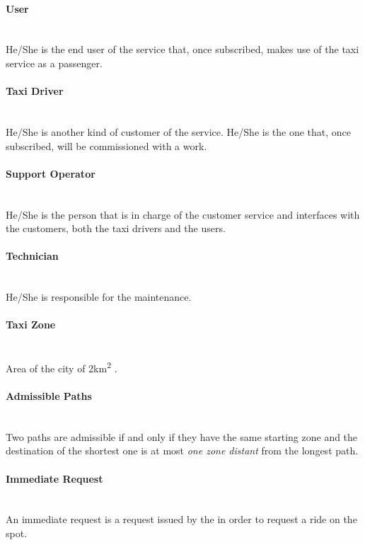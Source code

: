 \paragraph{User} \hfill \\
\label{def:user} He/She is the end user of the service that, once subscribed, makes use of the taxi service as a passenger.

\paragraph{Taxi Driver} \hfill \\
\label{def:taxidriver} He/She is another kind of customer of the service. He/She is the one that, once subscribed, will be commissioned with a work.

\paragraph{Support Operator} \hfill \\
\label{def:operator} He/She is the person that is in charge of the customer service and interfaces with the customers, both the taxi drivers and the users.

\paragraph{Technician} \hfill \\
\label{def:technician} He/She is responsible for the maintenance.

\paragraph{Taxi Zone} \hfill \\
\label{def:taxi_zone} Area of the city of 2km\textsuperscript{2} .

\paragraph{Admissible Paths} \hfill \\
\label{def:admissible} Two paths are admissible if and only if they have the same starting zone and the destination of the shortest one is at most \emph{one zone distant} from the longest path.

\paragraph{Immediate Request} \hfill \\
\label{def:immediate-request} An immediate request is a request issued by the  in order to request a ride on the spot.

